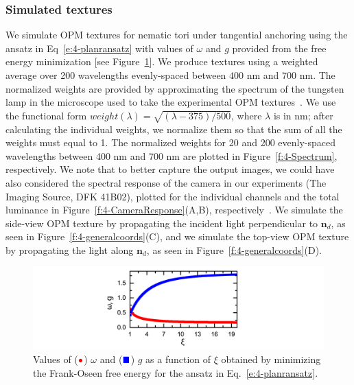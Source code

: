 \subsubsection{Simulated textures}
We simulate OPM textures for nematic tori under tangential anchoring using the ansatz in Eq~\ref{e:4-planransatz} with values of $\omega$ and $g$ provided from the free energy minimization [see Figure~\ref{f:4-OmegaG}].
We produce textures using a weighted average over 200 wavelengths evenly-spaced between $400$ nm and $700$ nm.
The normalized weights are provided by approximating the spectrum of the tungsten lamp in the microscope used to take the experimental OPM textures~\cite{RN288}.
We use the functional form $\mathit{weight}(\lambda)  = \sqrt{(\lambda-375)/500} $, where $\lambda$ is in nm; after calculating the individual weights, we normalize them so that the sum of all the weights must equal to 1.
The normalized weights for 20 and 200 evenly-spaced wavelengths between 400 nm and 700 nm are plotted in Figure~\ref{f:4-Spectrum}, respectively.
We note that to better capture the output images, we could have also considered the spectral response of the camera in our experiments (The Imaging Source, DFK 41B02), plotted for the individual channels and the total luminance in Figure~\ref{f:4-CameraResponse}(A,B), respectively~\cite{camera}.
We simulate the side-view OPM texture by propagating the incident light perpendicular to $\mathbf{n}_d$, as seen in Figure~\ref{f:4-generalcoords}(C), and we simulate the top-view OPM texture by propagating the light along $\mathbf{n}_d$, as seen in Figure~\ref{f:4-generalcoords}(D).
\begin{figure}
  \includegraphics{figures/C4/Ch4-Figs_OmegaG.png}
  \caption{Values of ($\color{red} \bullet$) $\omega$ and ($\color{blue}\blacksquare$) $g$ as a function of $\xi$ obtained by minimizing the Frank-Oseen free energy for the ansatz in Eq.~\ref{e:4-planransatz}.}\label{f:4-OmegaG}
\end{figure}

